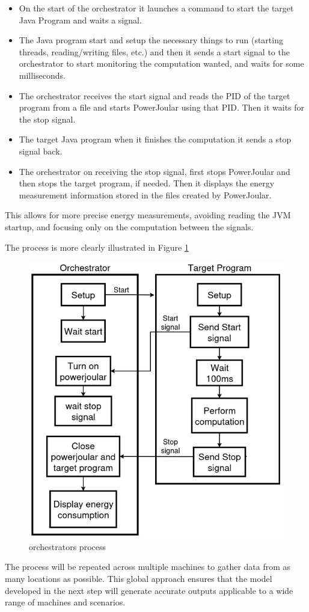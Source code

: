 \documentclass[sigplan]{acmart}
\begin{document}
\begin{itemize}
  \item On the start of the orchestrator it launches a command to start the target Java Program and waits a signal.
  \item The Java program start and setup the necessary things to run (starting threads, reading/writing files, etc.) and then it sends a start signal to the orchestrator to start monitoring the computation wanted, and waits for some milliseconds. 
  \item The orchestrator receives the start signal and reads the PID of the target program from a file and starts PowerJoular using that PID. Then it waits for the stop signal.
  \item The target Java program when it finishes the computation it sends a stop signal back.
  \item The orchestrator on receiving the stop signal, first stops PowerJoular and then stops the target program, if needed. Then it displays the energy measurement information stored in the files created by PowerJoular. \\
\end{itemize}

This allows for more precise energy measurements, avoiding reading the JVM startup, and focusing only on the computation between the signals.

The process is more clearly illustrated in Figure \ref{fig:orchestrators_process}

\begin{figure}%
  \centering
  \includegraphics[width = 0.4 \textwidth]{figures/orchestrators_process.png}
  \caption{orchestrators process}
  \label{fig:orchestrators_process}
\end{figure}

The process will be repeated across multiple machines to gather data from as many locations as possible. This global approach ensures that the model developed in the next step will generate accurate outputs applicable to a wide range of machines and scenarios.
\end{document}
